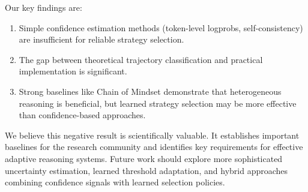 \documentclass{article}
\begin{document}
Our key findings are:
\begin{enumerate}
    \item Simple confidence estimation methods (token-level logprobs, self-consistency) are insufficient for reliable strategy selection.
    \item The gap between theoretical trajectory classification and practical implementation is significant.
    \item Strong baselines like Chain of Mindset demonstrate that heterogeneous reasoning is beneficial, but learned strategy selection may be more effective than confidence-based approaches.
\end{enumerate}

We believe this negative result is scientifically valuable. It establishes important baselines for the research community and identifies key requirements for effective adaptive reasoning systems. Future work should explore more sophisticated uncertainty estimation, learned threshold adaptation, and hybrid approaches combining confidence signals with learned selection policies.



\end{document}
